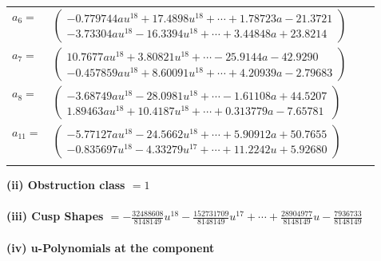 \documentclass[1p]{elsarticle_modified}
\theoremstyle{definition}
\begin{document}
\begin{tabular}{m{7pt} m{180pt} m{7pt} m{180pt} }
\flushright $a_{6}=$&$\begin{pmatrix}-0.779744 a u^{18}+17.4898 u^{18}+\cdots+1.78723 a-21.3721\\-3.73304 a u^{18}-16.3394 u^{18}+\cdots+3.44848 a+23.8214\end{pmatrix}$ \\
\flushright $a_{7}=$&$\begin{pmatrix}10.7677 a u^{18}+3.80821 u^{18}+\cdots-25.9144 a-42.9290\\-0.457859 a u^{18}+8.60091 u^{18}+\cdots+4.20939 a-2.79683\end{pmatrix}$ \\
\flushright $a_{8}=$&$\begin{pmatrix}-3.68749 a u^{18}-28.0981 u^{18}+\cdots-1.61108 a+44.5207\\1.89463 a u^{18}+10.4187 u^{18}+\cdots+0.313779 a-7.65781\end{pmatrix}$ \\
\flushright $a_{11}=$&$\begin{pmatrix}-5.77127 a u^{18}-24.5662 u^{18}+\cdots+5.90912 a+50.7655\\-0.835697 u^{18}-4.33279 u^{17}+\cdots+11.2242 u+5.92680\end{pmatrix}$\\&\end{tabular}
\flushleft \textbf{(ii) Obstruction class $= 1$}\\~\\
\flushleft \textbf{(iii) Cusp Shapes $= -\frac{32488608}{8148149} u^{18}-\frac{152731709}{8148149} u^{17}+\cdots+\frac{28904977}{8148149} u-\frac{7936733}{8148149}$}\\~\\
\newpage\renewcommand{\arraystretch}{1}
\flushleft \textbf{(iv) u-Polynomials at the component}\newline \\
\end{document}
